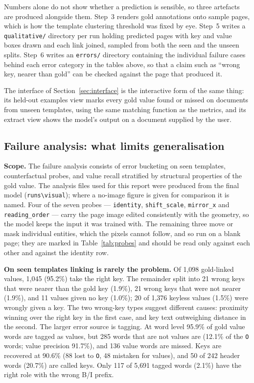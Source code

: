 \documentclass[11pt,a4paper]{article}
\newcommand{\code}[1]{\texttt{\small #1}}
\begin{document}
Numbers alone do not show whether a prediction is sensible, so three artefacts are produced
alongside them. Step~3 renders gold annotations onto sample pages, which is how the template
clustering threshold was fixed by eye. Step~5 writes a \code{qualitative/} directory per run
holding predicted pages with key and value boxes drawn and each link joined, sampled from both the
seen and the unseen splits. Step~6 writes an \code{errors/} directory containing the individual
failure cases behind each error category in the tables above, so that a claim such as ``wrong key,
nearer than gold'' can be checked against the page that produced it.

The interface of Section~\ref{sec:interface} is the interactive form of the same thing: its
held-out examples view marks every gold value found or missed on documents from unseen templates,
using the same matching function as the metrics, and its extract view shows the model's output on
a document supplied by the user.

\subsection{Failure analysis: what limits generalisation}
\label{sec:limits}

\textbf{Scope.} The failure analysis consists of error bucketing on seen templates, counterfactual
probes, and value recall stratified by structural properties of the gold value. The analysis files
used for this report were produced from the final model (\code{runs\textbackslash visual}); where a
no-image figure is given for comparison it is named. Four of the seven probes --- \code{identity},
\code{shift\_scale}, \code{mirror\_x} and \code{reading\_order} --- carry the page image edited
consistently with the geometry, so the model keeps the input it was trained with. The remaining
three move or mask individual entities, which the pixels cannot follow, and so run on a blank page;
they are marked in Table~\ref{tab:probes} and should be read only against each other and against
the identity row.

\textbf{On seen templates linking is rarely the problem.} Of 1{,}098 gold-linked values, 1{,}045
(95.2\%) take the right key. The remainder split into 21 wrong keys that were nearer than the
gold key (1.9\%), 21 wrong keys that were not nearer (1.9\%), and 11 values given no key (1.0\%);
20 of 1{,}376 keyless values (1.5\%) were wrongly given a key. The two wrong-key types suggest
different causes: proximity winning over the right key in the first case, and key text outweighing
distance in the second. The larger error source is tagging. At word level 95.9\% of gold value
words are tagged as values, but 285 words that are not values are (12.1\% of the \code{O} words;
value precision 91.7\%), and 136 value words are missed. Keys are recovered at 90.6\% (88 lost to
\code{O}, 48 mistaken for values), and 50 of 242 header words (20.7\%) are called keys. Only 117
of 5{,}691 tagged words (2.1\%) have the right role with the wrong B/I prefix.
\end{document}
